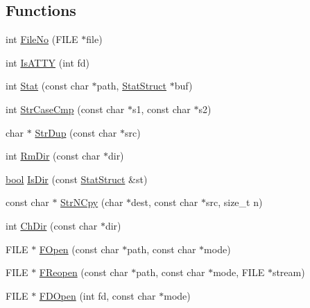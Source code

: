 \subsection*{Functions}
\begin{DoxyCompactItemize}
\item 
int \hyperlink{namespacetesting_1_1internal_1_1posix_a3117b067e1f942a2031e666953120ccc}{File\+No} (F\+I\+LE $\ast$file)
\item 
int \hyperlink{namespacetesting_1_1internal_1_1posix_a16ebe936b3a8ea462a94191635aedc27}{Is\+A\+T\+TY} (int fd)
\item 
int \hyperlink{namespacetesting_1_1internal_1_1posix_a2b87b7ff647a128614daf50667eb9304}{Stat} (const char $\ast$path, \hyperlink{namespacetesting_1_1internal_1_1posix_a8eb9f08d3af29941c2d2a964cfff3ecb}{Stat\+Struct} $\ast$buf)
\item 
int \hyperlink{namespacetesting_1_1internal_1_1posix_a1ef2385a7f8e4c706054da35967e76bd}{Str\+Case\+Cmp} (const char $\ast$s1, const char $\ast$s2)
\item 
char $\ast$ \hyperlink{namespacetesting_1_1internal_1_1posix_a8e352884793a65ae8be144676f1a9136}{Str\+Dup} (const char $\ast$src)
\item 
int \hyperlink{namespacetesting_1_1internal_1_1posix_acbad5d4ea5b73fd1765f5f760642932a}{Rm\+Dir} (const char $\ast$dir)
\item 
\hyperlink{classbool}{bool} \hyperlink{namespacetesting_1_1internal_1_1posix_af0d04ed5baeed28353fa38742748a421}{Is\+Dir} (const \hyperlink{namespacetesting_1_1internal_1_1posix_a8eb9f08d3af29941c2d2a964cfff3ecb}{Stat\+Struct} \&st)
\item 
const char $\ast$ \hyperlink{namespacetesting_1_1internal_1_1posix_a36fca815713332e5c6dc92c98b6b2574}{Str\+N\+Cpy} (char $\ast$dest, const char $\ast$src, size\+\_\+t n)
\item 
int \hyperlink{namespacetesting_1_1internal_1_1posix_a1ddc8a4fc6bb21da372307485591a212}{Ch\+Dir} (const char $\ast$dir)
\item 
F\+I\+LE $\ast$ \hyperlink{namespacetesting_1_1internal_1_1posix_a4042201dcc4932641d484e7ddf94de7d}{F\+Open} (const char $\ast$path, const char $\ast$mode)
\item 
F\+I\+LE $\ast$ \hyperlink{namespacetesting_1_1internal_1_1posix_a9ef6d089cdae03f9d9e0e6d379c40703}{F\+Reopen} (const char $\ast$path, const char $\ast$mode, F\+I\+LE $\ast$stream)
\item 
F\+I\+LE $\ast$ \hyperlink{namespacetesting_1_1internal_1_1posix_af7c268eba32d5a718b36b6b3801302e0}{F\+D\+Open} (int fd, const char $\ast$mode)

\end{DoxyCompactItemize}
